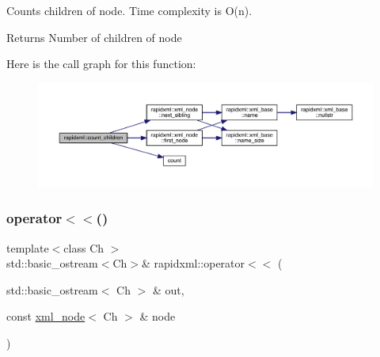 Counts children of node. Time complexity is O(n). \begin{DoxyReturn}{Returns}
Number of children of node 
\end{DoxyReturn}
Here is the call graph for this function\+:
\nopagebreak
\begin{figure}[H]
\begin{center}
\leavevmode
\includegraphics[width=350pt]{namespacerapidxml_a21c1cf2814019385e6b8d09e75af1d34_cgraph}
\end{center}
\end{figure}
\mbox{\label{namespacerapidxml_a9ed8e626dd81348caede1f92a6c8418a}} 
\subsubsection{\texorpdfstring{operator$<$$<$()}{operator<<()}}
{\footnotesize\ttfamily template$<$class Ch $>$ \\
std\+::basic\+\_\+ostream$<$Ch$>$\& rapidxml\+::operator$<$$<$ (\begin{DoxyParamCaption}\item[{std\+::basic\+\_\+ostream$<$ Ch $>$ \&}]{out,  }\item[{const \mbox{\hyperlink{classrapidxml_1_1xml__node}{xml\+\_\+node}}$<$ Ch $>$ \&}]{node }\end{DoxyParamCaption})\hspace{0.3cm}{\ttfamily [inline]}}

